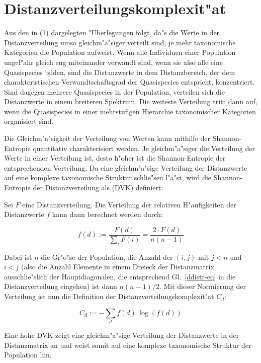 \section{Distanzverteilungskomplexit"at}
\label{ddc-method}

Aus den in (\ref{ddc-method}) dargelegten "Uberlegungen folgt, da"s die Werte
in der Distanzverteilung umso gleichm"a"siger verteilt sind, je mehr taxonomische
Kategorien die Population aufweist. Wenn alle Individuen einer Population ungef"ahr
gleich eng miteinander verwandt sind, wenn sie also alle eine Quasispecies bilden,
sind die Distanzwerte in dem Distanzbereich, der dem charakteristischen Verwandtschaftsgrad
der Quasispecies entspricht, konzentriert. Sind dagegen mehrere Quasispecies in der
Population, verteilen sich die Distanzwerte in einem breiteren Spektrum. Die
weiteste Verteilung tritt dann auf, wenn die Quasispecies in einer mehrstufigen
Hierarchie taxonomischer Kategorien organisiert sind.

Die Gleichm"a"sigkeit der Verteilung von Werten kann mithilfe der Shannon-Entropie \cite{Shannon}
quantitativ charakterisiert werden. Je gleichm"a"siger die Verteilung der Werte in einer Verteilung
ist, desto h"oher ist die Shannon-Entropie der entsprechenden Verteilung. Da eine gleichm"a"sige
Verteilung der Distanzwerte auf eine komplexe taxonomische Struktur schlie"sen l"a"st, wird
die Shannon-Entropie der Distanzverteilung als  (DVK) \cite{Kim95,Kim95a}
definiert:

Sei $F$ eine Distanzverteilung. Die Verteilung der relativen H"aufigkeiten der Distanzwerte $f$
kann dann berechnet werden durch:

\begin{equation}
f(d) := \frac{F(d)}{\sum_i F(i)} = \frac{2 \cdot F(d)}{n(n-1)}
\end{equation}

Dabei ist $n$ die Gr"o"se der Population, die Anzahl der $(i, j)$ mit $j < n$ und $i < j$ (also die
Anzahl Elemente in einem Dreieck der Distanzmatrix ausschlie"slich der Hauptdiagonalen, die entsprechend
Gl.\ \ref{ddistr-eq} in die Distanzverteilung eingehen) ist dann
$n(n-1) / 2$. Mit dieser Normierung der Verteilung ist nun die Definition
der Distanzverteilungskomplexit"at $C_d$:

\begin{equation}
C_d := -\sum_d f(d)\, \log(f(d))
\end{equation}

Eine hohe DVK zeigt eine gleichm"a"sige Verteilung der Distanzwerte in der Distanzmatrix
an und weist somit auf eine komplexe taxonomische Struktur der Population hin.

